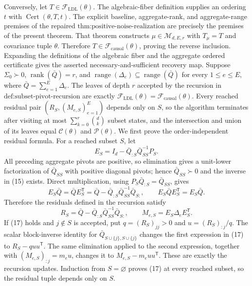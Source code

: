 Conversely, let \(T\in\mathcal F_{\mathrm{LDL}}(\theta)\).  The algebraic-fiber definition supplies an ordering \(t\) with \(\operatorname{Cert}(\theta,T,t)\).  The explicit baseline, aggregate-rank, and aggregate-range premises of the repaired \(\text{thm:positive-noise-realization}\) are precisely the premises of the present theorem.  That theorem constructs \(\mu\in\mathcal M_{d,E,r}\) with \(T_{\mu}=T\) and covariance tuple \(\theta\).  Therefore \(T\in\mathcal F_{\mathrm{causal}}(\theta)\), proving the reverse inclusion.  Expanding the definitions of the algebraic fiber and the aggregate ordered certificate gives the asserted necessary-and-sufficient recovery map.
Suppose \(\Sigma_0\succ0\), \(\operatorname{rank}(\bar Q)=r\), and \(\operatorname{range}(\Delta_e)\subseteq\operatorname{range}(\bar Q)\) for every \(1\le e\le E\), where \(\bar Q=\sum_{e=1}^E\Delta_e\).  The leaves of depth \(r\) accepted by the recursion in \(\text{def:subset-pivot-recursion}\) are exactly \(\mathcal F_{\mathrm{LDL}}(\theta)=\mathcal F_{\mathrm{causal}}(\theta)\).  Every reached residual pair \((R_S,(M_{e,S})_{e=1}^{E})\) depends only on \(S\), so the algorithm terminates after visiting at most \(\sum_{k=0}^{r}\binom{d}{k}\) subset states, and the intersection and union of its leaves equal \(\mathcal C(\theta)\) and \(\mathcal P(\theta)\).
We first prove the order-independent residual formula.  For a reached subset \(S\), let
\[
 E_S=I_d-\bar Q_{:S}\bar Q_{SS}^{-1}P_S. \tag{15}
\]
All preceding aggregate pivots are positive, so elimination gives a unit-lower factorization of \(\bar Q_{SS}\) with positive diagonal pivots; hence \(\bar Q_{SS}\succ0\) and the inverse in (15) exists.  Direct multiplication, using \(P_S\bar Q_{:S}=\bar Q_{SS}\), gives
\[
 E_S\bar Q=\bar QE_S^{\mathsf T}
 =\bar Q-\bar Q_{:S}\bar Q_{SS}^{-1}\bar Q_{S:},
 \qquad E_S\bar QE_S^{\mathsf T}=E_S\bar Q. \tag{16}
\]
Therefore the residuals defined in the recursion satisfy
\[
 R_S=\bar Q-\bar Q_{:S}\bar Q_{SS}^{-1}\bar Q_{S:},
 \qquad M_{e,S}=E_S\Delta_eE_S^{\mathsf T}. \tag{17}
\]
If (17) holds and \(j\notin S\) is accepted, put \(q=(R_S)_{jj}>0\) and \(u=(R_S)_{:j}/q\).  The scalar block-inverse identity for \(\bar Q_{S\cup\{j\},S\cup\{j\}}\) changes the first expression in (17) to
\(R_S-quu^{\mathsf T}\).  The same elimination applied to the second expression, together with
\((M_{e,S})_{:j}=m_eu\), changes it to \(M_{e,S}-m_euu^{\mathsf T}\).  These are exactly the recursion updates.  Induction from \(S=\varnothing\) proves (17) at every reached subset, so the residual tuple depends only on \(S\).

